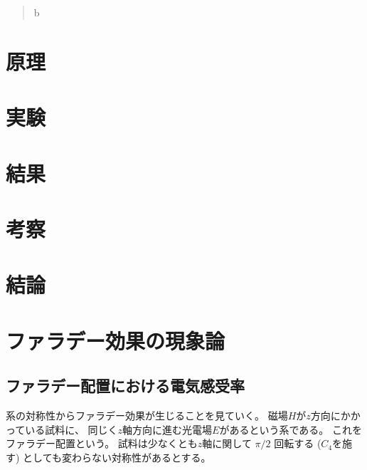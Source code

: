 \documentclass[9pt,dvipdfmx,a4paper]{jsarticle}
\begin{document}

\begin{abstract}
    b
\end{abstract}


\section{原理}

\section{実験}

\section{結果}

\section{考察}

\section{結論}



\nocite{*}
\appendix
\section{ファラデー効果の現象論}
\subsection{ファラデー配置における電気感受率}
系の対称性からファラデー効果が生じることを見ていく。
磁場\(H\)が\(z\)方向にかかっている試料に、
同じく\(z\)軸方向に進む光電場\(E\)があるという系である。
これをファラデー配置という。
試料は少なくとも\(z\)軸に関して \(\pi/2\) 回転する (\(C_4\)を施す) としても変わらない対称性があるとする。
\end{document}
